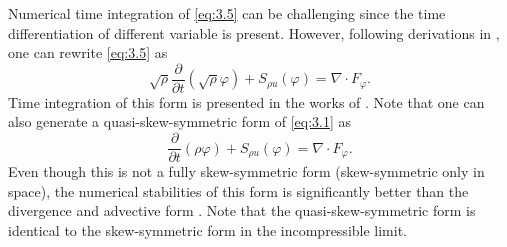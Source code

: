 Numerical time integration of \eqref{eq:3.5} can be challenging since the time differentiation of different variable is present. However, following derivations in \cite{morinishi2010skew}, one can rewrite \eqref{eq:3.5} as
\begin{equation} \label{eq:3.6}
	\sqrt{\rho } \frac{\partial }{\partial t} (\sqrt \rho \varphi ) + S_{\rho u}(\varphi) = \nabla \cdot F_{\varphi}.
\end{equation}
Time integration of this form is presented in the works of \cite{morinishi2010skew,reiss2014conservative}. Note that one can also generate a quasi-skew-symmetric form \cite{blaisdell1991numerical,morinishi2003dns} of \eqref{eq:3.1} as
\begin{equation} \label{eq:3.7}
	\frac{\partial }{\partial t} (\rho \varphi) + S_{\rho u}(\varphi) = \nabla \cdot F_{\varphi}.
\end{equation}
Even though this is not a fully skew-symmetric form (skew-symmetric only in space), the numerical stabilities of this form is significantly better than the divergence and advective form \cite{morinishi2010skew,blaisdell1991numerical,morinishi2003dns}. Note that the quasi-skew-symmetric form is identical to the skew-symmetric form in the incompressible limit.

